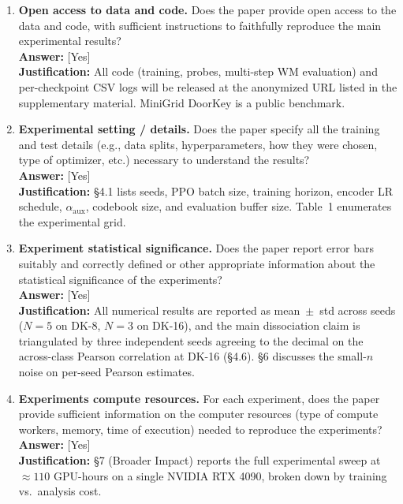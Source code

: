 \begin{enumerate}
  \item \textbf{Open access to data and code.} Does the paper provide open access to the data and code, with sufficient instructions to faithfully reproduce the main experimental results?\\
  \textbf{Answer:} [Yes]\\
  \textbf{Justification:} All code (training, probes, multi-step WM evaluation) and per-checkpoint CSV logs will be released at the anonymized URL listed in the supplementary material. MiniGrid DoorKey is a public benchmark.

  \item \textbf{Experimental setting / details.} Does the paper specify all the training and test details (e.g., data splits, hyperparameters, how they were chosen, type of optimizer, etc.) necessary to understand the results?\\
  \textbf{Answer:} [Yes]\\
  \textbf{Justification:} \S4.1 lists seeds, PPO batch size, training horizon, encoder LR schedule, $\alpha_{\text{aux}}$, codebook size, and evaluation buffer size. Table~1 enumerates the experimental grid.

  \item \textbf{Experiment statistical significance.} Does the paper report error bars suitably and correctly defined or other appropriate information about the statistical significance of the experiments?\\
  \textbf{Answer:} [Yes]\\
  \textbf{Justification:} All numerical results are reported as mean~$\pm$~std across seeds ($N{=}5$ on DK-8, $N{=}3$ on DK-16), and the main dissociation claim is triangulated by three independent seeds agreeing to the decimal on the across-class Pearson correlation at DK-16 (\S4.6). \S6 discusses the small-$n$ noise on per-seed Pearson estimates.

  \item \textbf{Experiments compute resources.} For each experiment, does the paper provide sufficient information on the computer resources (type of compute workers, memory, time of execution) needed to reproduce the experiments?\\
  \textbf{Answer:} [Yes]\\
  \textbf{Justification:} \S7 (Broader Impact) reports the full experimental sweep at $\approx 110$ GPU-hours on a single NVIDIA RTX 4090, broken down by training vs.\ analysis cost.


\end{enumerate}
